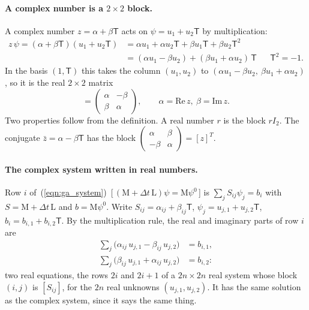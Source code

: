 \paragraph{A complex number is a $2\times 2$ block.} A complex number $z = \alpha + \beta \mathsf T$ acts on $\psi = u_1 + u_2 \mathsf T$ by multiplication:
\begin{align*}
z\,\psi = (\alpha + \beta\mathsf T)(u_1 + u_2\mathsf T) &= \alpha u_1 + \alpha u_2\mathsf T + \beta u_1\mathsf T + \beta u_2\mathsf T^2 \\
&= (\alpha u_1 - \beta u_2) + (\beta u_1 + \alpha u_2)\,\mathsf T && \mathsf T^2 = -1 .
\end{align*}
In the basis $(1, \mathsf T)$ this takes the column $(u_1, u_2)$ to $(\alpha u_1 - \beta u_2,\ \beta u_1 + \alpha u_2)$, so it is the real $2 \times 2$ matrix
\begin{equation*}
[z] = \begin{pmatrix} \alpha & -\beta \\ \beta & \alpha \end{pmatrix}, \qquad \alpha = \mathrm{Re}\, z,\ \beta = \mathrm{Im}\, z .
\end{equation*}
Two properties follow from the definition. A real number $r$ is the block $r I_2$. The conjugate $\bar z = \alpha - \beta\mathsf T$ has the block $\begin{pmatrix}\alpha & \beta\\ -\beta & \alpha\end{pmatrix} = [z]^T$.

\paragraph{The complex system written in real numbers.} Row $i$ of~(\ref{eqn:ga_system})~[\,$(\mathrm M + \Delta t\,\mathrm L)\psi = \mathrm M\psi^0$\,] is $\sum_j S_{ij}\psi_j = b_i$ with $S = \mathrm M + \Delta t\,\mathrm L$ and $b = \mathrm M\psi^0$. Write $S_{ij} = \alpha_{ij} + \beta_{ij}\mathsf T$, $\psi_j = u_{j,1} + u_{j,2}\mathsf T$, $b_i = b_{i,1} + b_{i,2}\mathsf T$. By the multiplication rule, the real and imaginary parts of row $i$ are
\begin{align*}
\sum_j \big(\alpha_{ij}\, u_{j,1} - \beta_{ij}\, u_{j,2}\big) &= b_{i,1} , \\
\sum_j \big(\beta_{ij}\, u_{j,1} + \alpha_{ij}\, u_{j,2}\big) &= b_{i,2} :
\end{align*}
two real equations, the rows $2i$ and $2i + 1$ of a $2n\times 2n$ real system whose block $(i, j)$ is $[S_{ij}]$, for the $2n$ real unknowns $(u_{j,1}, u_{j,2})$. It has the same solution as the complex system, since it says the same thing.

